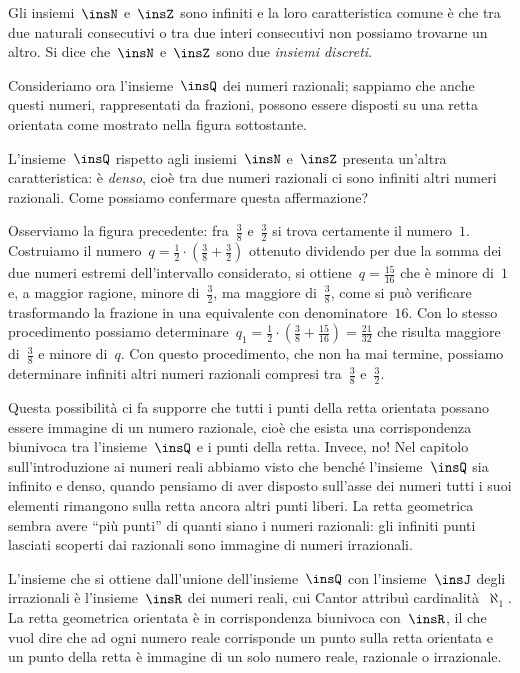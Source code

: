 Gli insiemi~$\insN$ e~$\insZ$ sono infiniti e la loro caratteristica comune è 
che tra due naturali consecutivi o tra due interi consecutivi
non possiamo trovarne un altro. Si dice che~$\insN$ e~$\insZ$ sono due 
\emph{insiemi discreti}.

Consideriamo ora l'insieme~$\insQ$ dei numeri razionali; sappiamo che anche 
questi numeri, rappresentati da frazioni, possono essere disposti
su una retta orientata come mostrato nella figura sottostante.
\begin{center}
 
\end{center}
L'insieme~$\insQ$ rispetto agli insiemi~$\insN$ e~$\insZ$ presenta un'altra 
caratteristica: è \emph{denso}, cioè tra due numeri razionali
ci sono infiniti altri numeri razionali.
Come possiamo confermare questa affermazione?

Osserviamo la figura precedente: fra~$\frac{3}{8}$ e~$\frac{3}{2}$ si trova 
certamente il numero~$1$.
Costruiamo il numero~$q=\frac{1}{2} \cdot \left(\frac{3}{8}+\frac{3}{2}\right)$ 
ottenuto dividendo per due la somma dei due numeri estremi
dell'intervallo considerato, si ottiene~$q=\frac{15}{16}$ che è minore di~$1$ e, 
a maggior ragione, minore di~$\frac{3}{2}$,
ma maggiore di~$\frac{3}{8}$, come si può verificare trasformando la frazione in 
una equivalente con denominatore~$16$.
Con lo stesso procedimento possiamo determinare~$q_{1}=\frac{1}{2}\cdot 
\left(\frac{3}{8}+\frac{15}{16}\right)=\frac{21}{32}$
che risulta maggiore di~$\frac{3}{8}$ e minore di~$q$. Con questo procedimento, 
che non ha mai termine, possiamo determinare
infiniti altri numeri razionali compresi tra~$\frac{3}{8}$ e~$\frac{3}{2}$.
\begin{center}
 
\end{center}

Questa possibilità ci fa supporre che tutti i punti della retta orientata 
possano essere immagine di un numero razionale,
cioè che esista una corrispondenza biunivoca tra l'insieme~$\insQ$ e i punti 
della retta.
Invece, no! Nel capitolo sull'introduzione ai numeri reali abbiamo visto che 
benché l'insieme~$\insQ$ sia infinito e denso,
quando pensiamo di aver disposto sull'asse dei numeri tutti i suoi elementi 
rimangono sulla retta ancora altri punti liberi.
La retta geometrica sembra avere ``più punti'' di quanti siano i numeri 
razionali: gli infiniti punti lasciati scoperti dai razionali
sono immagine di numeri irrazionali.

L'insieme che si ottiene dall'unione dell'insieme~$\insQ$ con l'insieme~$\insJ$ 
degli irrazionali è l'insieme~$\insR$ dei numeri reali, cui
Cantor attribuì cardinalità~$\aleph_1$. La retta geometrica orientata è in 
corrispondenza biunivoca con~$\insR$,
il che vuol dire che ad ogni numero reale corrisponde un punto sulla retta 
orientata e un punto della retta è immagine
di un solo numero reale, razionale o irrazionale.

